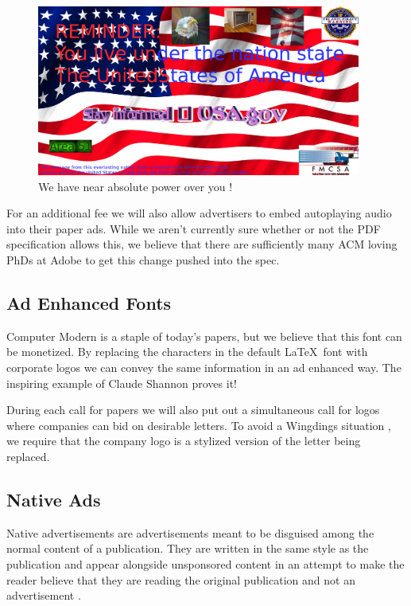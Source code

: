 \begin{figure}
\centering
\includegraphics[width=0.95\textwidth]{figures/usa-ad.png}
\caption{We have near absolute power over you \cite{eagle, kanye, microwave}!}
\label{fig:usa}
\end{figure}

For an additional fee we will also allow advertisers to embed autoplaying audio
into their paper ads.
While we aren't currently sure whether or not the PDF specification allows
this, we believe that there are sufficiently many ACM loving PhDs at Adobe to
get this change  pushed into the spec.

\subsection{Ad Enhanced Fonts}
Computer Modern is a staple of today's papers, but we believe that this font can
be monetized.
By replacing the characters in the default \LaTeX\ font with corporate logos
we can convey the same information in an ad enhanced way. The inspiring example of Claude Shannon proves it!



During each call for papers we will also put out a simultaneous call for
logos where companies can bid on desirable letters.
To avoid a Wingdings situation \cite{wingdings}, we require that the company
logo is a stylized version of the letter being replaced.


\subsection{Native Ads}
Native advertisements are advertisements meant to be disguised among the normal
content of a publication.
They are written in the same style as the publication and appear alongside
unsponsored content in an attempt to make the reader believe that they are
reading the original publication and not an advertisement \cite{native}.

